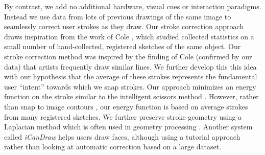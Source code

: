 By contrast, we add no additional hardware, visual cues or
interaction paradigms. Instead we use data from lots of previous
drawings of the same image to seamlessly correct user strokes as
they draw. Our stroke correction approach draws inspiration from the
work of Cole \etal {}, which studied
collected statistics on a small number of hand-collected, registered
sketches of the same object. Our stroke correction method was
inspired by the finding of Cole \etal (confirmed by our data) that
artists frequently draw similar lines. We further develop this this
idea with our hypothesis that the average of these strokes
represents the fundamental user ``intent'' towards which we snap
strokes. Our approach minimizes an energy function on the stroke
similar to the intelligent scissors method
\cite{Mortensen:1995:ISF}. However, rather than snap to image
contours , our energy function is based on average strokes from
many registered sketches. We further preserve stroke geometry using
a Laplacian method which is often used in geometry processing
\cite{Sorkine:2004:LSE}. Another system called \emph{iCanDraw}
\cite{Dixon:2010:IUS} helps users draw faces, although using a
tutorial approach rather than looking at automatic correction based
on a large dataset.

% 
% 
